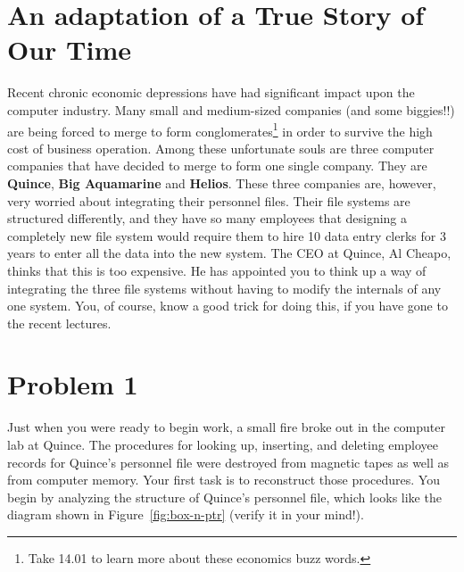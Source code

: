 \bigskip


\section{An adaptation of a True Story of Our Time}

Recent chronic economic depressions have had significant impact upon the
computer industry.  Many small and medium-sized companies (and some biggies!!)
are being forced to merge to form conglomerates\footnote{Take 14.01 to learn more
about these economics buzz words.} in order to survive the high cost of
business
operation.  Among these unfortunate souls are three computer companies that
have decided to merge to form one single company.  They are {\bf Quince}, {\bf
Big Aquamarine} and {\bf Helios}.  These three companies are, however, very
worried about integrating their personnel files.  Their file systems are
structured differently, and they have so many employees that designing a
completely new file system would require them to hire 10 data entry clerks for
3 years to enter all the data into the new system.  The CEO at Quince, Al
Cheapo, thinks that this is too expensive.  He has appointed you to think up a
way of integrating the three file systems without having to modify the
internals of any one system.  You, of course, know a good trick for doing this,
if you have gone to the recent lectures.

\section{Problem 1}

Just when you were ready to begin work, a small fire broke
out in the computer lab at Quince.  The procedures for looking
up, inserting, and deleting employee records for Quince's
personnel file were destroyed from magnetic tapes as well as from
computer memory.  Your first task is to reconstruct those
procedures.  You begin by analyzing the
structure of Quince's personnel file, which looks like the diagram
shown in Figure~\ref{fig:box-n-ptr} (verify it in your mind!).

